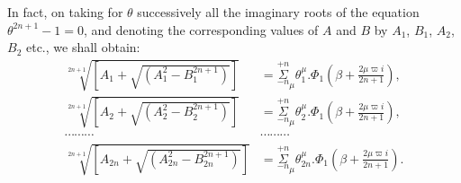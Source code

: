 \documentclass{article}
\begin{document}
In fact, on taking for $\theta$ successively all the imaginary roots of the equation $\theta^{2n+1}-1=0$, and denoting the corresponding values of $A$ and $B$ by $A_{1}$, $B_{1}$, $A_{2}$, $B_{2}$ etc., we shall obtain:
\[ \begin{aligned}
\sqrt[2n+1]{[A_{1}+\sqrt{(A_{1}^{2}-B_{1}^{2n+1})}]}&=\overset{+n}{\underset{-n}{\Sigma}}_{\mu}\theta_{1}^{\mu}.\Phi_{1}\left(\beta+\frac{2\mu\varpi i}{2n+1}\right),\\
\sqrt[2n+1]{[A_{2}+\sqrt{(A_{2}^{2}-B_{2}^{2n+1})}]}&=\overset{+n}{\underset{-n}{\Sigma}}_{\mu}\theta_{2}^{\mu}.\Phi_{1}\left(\beta+\frac{2\mu\varpi i}{2n+1}\right),\\
\cdots\cdots\cdots&\cdots\cdots\cdots\\
\sqrt[2n+1]{[A_{2n}+\sqrt{(A_{2n}^{2}-B_{2n}^{2n+1})}]}&=\overset{+n}{\underset{-n}{\Sigma}}_{\mu}\theta_{2n}^{\mu}.\Phi_{1}\left(\beta+\frac{2\mu\varpi i}{2n+1}\right).
\end{aligned} \]
\end{document}
